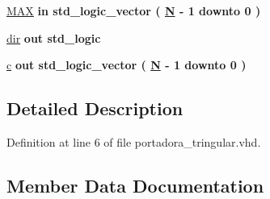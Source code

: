 \begin{DoxyCompactItemize}
\item 
\hyperlink{classportadora__tringular_a06de1330d80ce7a764361167217baf42}{M\+A\+X}  {\bfseries {\bfseries \textcolor{keywordflow}{in}\textcolor{vhdlchar}{ }}} {\bfseries \textcolor{comment}{std\+\_\+logic\+\_\+vector}\textcolor{vhdlchar}{ }\textcolor{vhdlchar}{(}\textcolor{vhdlchar}{ }\textcolor{vhdlchar}{ }\textcolor{vhdlchar}{ }\textcolor{vhdlchar}{ }{\bfseries \hyperlink{classportadora__tringular_af8ee6f7e8fea0e211d86d8e3fd6f8d29}{N}} \textcolor{vhdlchar}{-\/}\textcolor{vhdlchar}{ } \textcolor{vhdldigit}{1} \textcolor{vhdlchar}{ }\textcolor{keywordflow}{downto}\textcolor{vhdlchar}{ }\textcolor{vhdlchar}{ } \textcolor{vhdldigit}{0} \textcolor{vhdlchar}{ }\textcolor{vhdlchar}{)}\textcolor{vhdlchar}{ }} 
\item 
\hyperlink{classportadora__tringular_a8fb21bca6cb529fd30fa4b1f8b156237}{dir}  {\bfseries {\bfseries \textcolor{keywordflow}{out}\textcolor{vhdlchar}{ }}} {\bfseries \textcolor{comment}{std\+\_\+logic}\textcolor{vhdlchar}{ }} 
\item 
\hyperlink{classportadora__tringular_a54ed3cc1c7433faf63dbf6b009fe8137}{c}  {\bfseries {\bfseries \textcolor{keywordflow}{out}\textcolor{vhdlchar}{ }}} {\bfseries \textcolor{comment}{std\+\_\+logic\+\_\+vector}\textcolor{vhdlchar}{ }\textcolor{vhdlchar}{(}\textcolor{vhdlchar}{ }\textcolor{vhdlchar}{ }\textcolor{vhdlchar}{ }\textcolor{vhdlchar}{ }{\bfseries \hyperlink{classportadora__tringular_af8ee6f7e8fea0e211d86d8e3fd6f8d29}{N}} \textcolor{vhdlchar}{-\/}\textcolor{vhdlchar}{ } \textcolor{vhdldigit}{1} \textcolor{vhdlchar}{ }\textcolor{keywordflow}{downto}\textcolor{vhdlchar}{ }\textcolor{vhdlchar}{ } \textcolor{vhdldigit}{0} \textcolor{vhdlchar}{ }\textcolor{vhdlchar}{)}\textcolor{vhdlchar}{ }} 
\end{DoxyCompactItemize}


\subsection{Detailed Description}


Definition at line 6 of file portadora\+\_\+tringular.\+vhd.



\subsection{Member Data Documentation}
\hypertarget{classportadora__tringular_a54ed3cc1c7433faf63dbf6b009fe8137}{}
